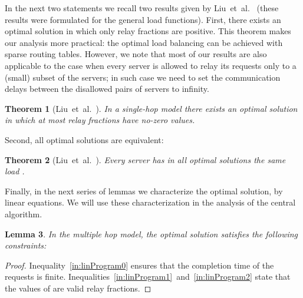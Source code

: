 \documentclass[11pt]{article}
\newtheorem{theorem}{Theorem}
\newtheorem{lemma}[theorem]{Lemma}
\begin{document}
In the next two statements we recall two results given by Liu~et~al.~\cite{Liu:2011:GGL:1993744.1993767} (these results were formulated for the general load functions). 
First, there exists an optimal solution in which only  relay fractions  are positive. This theorem makes our analysis more practical: the optimal load balancing can be achieved with sparse routing tables. However, we note that most of our results are also applicable to the case when every server is allowed to relay its requests only to a (small) subset of the servers; in such case we need to set the communication delays between the disallowed pairs of servers to infinity. 


\begin{theorem}[Liu~et~al.~\cite{Liu:2011:GGL:1993744.1993767}]
In a single-hop model there exists an optimal solution in which at most  relay fractions  have no-zero values.
\end{theorem}

Second, all optimal solutions are equivalent:
\begin{theorem}[Liu~et~al.~\cite{Liu:2011:GGL:1993744.1993767}]
Every server  has in all optimal solutions the same load .
\end{theorem}

Finally, in the next series of lemmas we characterize the optimal solution, by linear equations. We will use these characterization in the analysis of the central algorithm.

\begin{lemma}\label{lemma:linProg1}
In the multiple hop model, the optimal solution  satisfies the following constraints:

\end{lemma}
\begin{proof}
Inequality~\ref{in:linProgram0} ensures that the completion time of the requests is finite.
Inequalities~\ref{in:linProgram1}~and~\ref{in:linProgram2} state that the values of  are valid relay fractions.
\end{proof}
\end{document}

